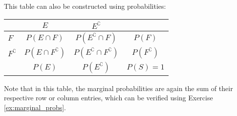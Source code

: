 This table can also be constructed using probabilities:
\begin{center}
\begin{tabular}{l|cc|c}
                       & \( E \) & \( E^\complement \) &  \\ \hline
\( F \)                & \( P(E \cap F) \) & \( P(E^\complement \cap F) \) & \( P(F) \) \\ 
\( F^\complement \)    & \( P(E \cap F^\complement) \) & \( P(E^\complement \cap F^\complement) \) & \( P(F^\complement) \) \\ \hline
                       & \( P(E) \) & \( P(E^\complement) \) & \( P(S) = 1 \)
\end{tabular}
\end{center}
Note that in this table, the marginal probabilities are again the sum of their respective row or column entries,
which can be verified using Exercise \autoref{ex:marginal_probs}.

